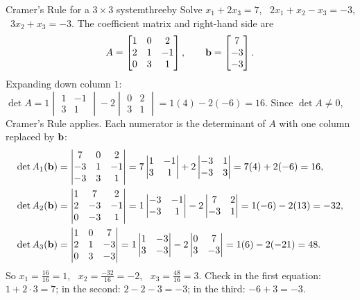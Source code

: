 \documentclass[11pt]{article}
\begin{document}
\begin{exmp}{Cramer's Rule for a $3\times3$ system}{threeby}
Solve $x_1+2x_3=7$, \ $2x_1+x_2-x_3=-3$, \ $3x_2+x_3=-3$. The coefficient matrix and right-hand side are
\[
A=\begin{bmatrix}1&0&2\\2&1&-1\\0&3&1\end{bmatrix},\qquad\mathbf{b}=\begin{bmatrix}7\\-3\\-3\end{bmatrix}.
\]
Expanding down column $1$: $\det A=1\begin{vmatrix}1&-1\\3&1\end{vmatrix}-2\begin{vmatrix}0&2\\3&1\end{vmatrix}=1(4)-2(-6)=16$. Since $\det A\neq0$, Cramer's Rule applies. Each numerator is the determinant of $A$ with one column replaced by $\mathbf{b}$:
\begin{align*}
\det A_1(\mathbf{b})&=\begin{vmatrix}7&0&2\\-3&1&-1\\-3&3&1\end{vmatrix}=7\begin{vmatrix}1&-1\\3&1\end{vmatrix}+2\begin{vmatrix}-3&1\\-3&3\end{vmatrix}=7(4)+2(-6)=16,\\
\det A_2(\mathbf{b})&=\begin{vmatrix}1&7&2\\2&-3&-1\\0&-3&1\end{vmatrix}=1\begin{vmatrix}-3&-1\\-3&1\end{vmatrix}-2\begin{vmatrix}7&2\\-3&1\end{vmatrix}=1(-6)-2(13)=-32,\\
\det A_3(\mathbf{b})&=\begin{vmatrix}1&0&7\\2&1&-3\\0&3&-3\end{vmatrix}=1\begin{vmatrix}1&-3\\3&-3\end{vmatrix}-2\begin{vmatrix}0&7\\3&-3\end{vmatrix}=1(6)-2(-21)=48.
\end{align*}
So $x_1=\frac{16}{16}=1$, \ $x_2=\frac{-32}{16}=-2$, \ $x_3=\frac{48}{16}=3$. Check in the first equation: $1+2\cdot3=7$; in the second: $2-2-3=-3$; in the third: $-6+3=-3$.
\end{exmp}
\end{document}
